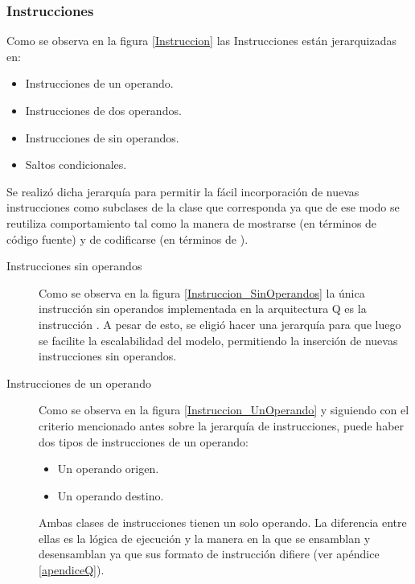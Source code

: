 {

\subsubsection{Instrucciones}
Como se observa en la figura \ref{Instruccion} las Instrucciones están jerarquizadas en:

\begin{itemize}
\item Instrucciones de un operando.
\item Instrucciones de dos operandos.
\item Instrucciones de sin operandos.
\item Saltos condicionales.
\end{itemize}

Se realizó dicha jerarquía para permitir la fácil incorporación de nuevas instrucciones como subclases de la clase que corresponda ya que de ese modo se reutiliza comportamiento tal como la manera de mostrarse (en términos de código fuente) y de codificarse (en términos de \codmaq).


\begin{description}
\item[Instrucciones sin operandos] Como se observa en la figura \ref{Instruccion_SinOperandos} la única instrucción sin operandos implementada en la arquitectura Q es la instrucción . A pesar de esto, se eligió hacer una jerarquía para que luego se facilite la escalabilidad del modelo, permitiendo la inserción de nuevas instrucciones sin operandos.


\item[Instrucciones de un operando] 
Como se observa en la figura \ref{Instruccion_UnOperando} y siguiendo con el criterio mencionado antes sobre la jerarquía de instrucciones, puede haber dos tipos de instrucciones de un operando:

\begin{itemize}
\item Un operando origen.
\item Un operando destino.
\end{itemize}

Ambas clases de instrucciones tienen un solo operando. La diferencia entre ellas es la lógica de ejecución y la manera en la que se ensamblan y desensamblan ya que sus formato de instrucción difiere (ver apéndice \ref{apendiceQ}).


\end{description}}
